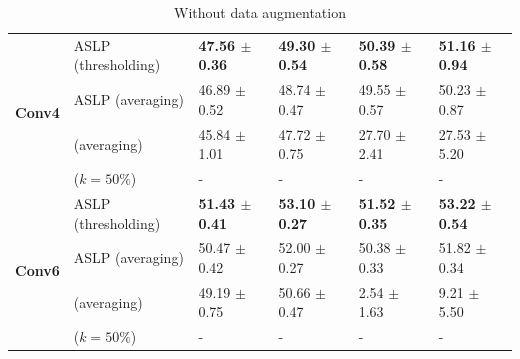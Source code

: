 \begin{table}[htbp]
\begin{subtable}[t]{\textwidth}
{\begin{tabular}{llllll}
        \multirow{4}{*}{\textbf{Conv4}} & \ac{ASLP} (thresholding)                              & \textbf{47.56 $\pm$ 0.36} & \textbf{49.30 $\pm$ 0.54} & \textbf{50.39 $\pm$ 0.58} & \textbf{51.16 $\pm$ 0.94} \\
                                        & \ac{ASLP} (averaging)                                 & 46.89 $\pm$ 0.52          & 48.74 $\pm$ 0.47          & 49.55 $\pm$ 0.57          & 50.23 $\pm$ 0.87          \\
                                        & \cite{DBLP:conf/nips/ZhouLLY19} (averaging)      & 45.84 $\pm$ 1.01          & 47.72 $\pm$ 0.75          & 27.70 $\pm$ 2.41          & 27.53 $\pm$ 5.20          \\
                                        & \cite{DBLP:conf/cvpr/RamanujanWKFR20} ($k=50\%$) & -                         & -                         & -                         & -                         \\

        \midrule

        \multirow{4}{*}{\textbf{Conv6}} & \ac{ASLP} (thresholding)                              & \textbf{51.43 $\pm$ 0.41} & \textbf{53.10 $\pm$ 0.27} & \textbf{51.52 $\pm$ 0.35} & \textbf{53.22 $\pm$ 0.54} \\
                                        & \ac{ASLP} (averaging)                                 & 50.47 $\pm$ 0.42          & 52.00 $\pm$ 0.27          & 50.38 $\pm$ 0.33          & 51.82 $\pm$ 0.34          \\
                                        & \cite{DBLP:conf/nips/ZhouLLY19} (averaging)      & 49.19 $\pm$ 0.75          & 50.66 $\pm$ 0.47          & 2.54 $\pm$ 1.63           & 9.21 $\pm$ 5.50           \\
                                        & \cite{DBLP:conf/cvpr/RamanujanWKFR20} ($k=50\%$) & -                         & -                         & -                         & -                         \\

        \bottomrule
      \end{tabular}
    }
    \caption{Without data augmentation}
  \end{subtable}


\end{table}
